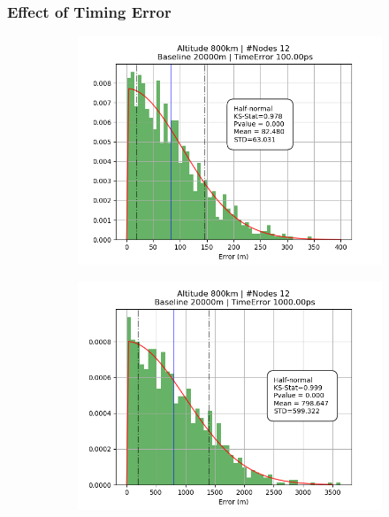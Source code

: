 \documentclass{article}
\begin{document}
\subsubsection{Effect of Timing Error}
\begin{figure}[H]
  \centering
  \begin{subfigure}[b]{0.49\linewidth}
    \includegraphics[width=\linewidth]{figures/graphs/800_12_20000_100}
  \end{subfigure}
  \begin{subfigure}[b]{0.49\linewidth}
    \includegraphics[width=\linewidth]{figures/graphs/800_12_20000_1000}
  \end{subfigure}
\end{figure}
\end{document}
